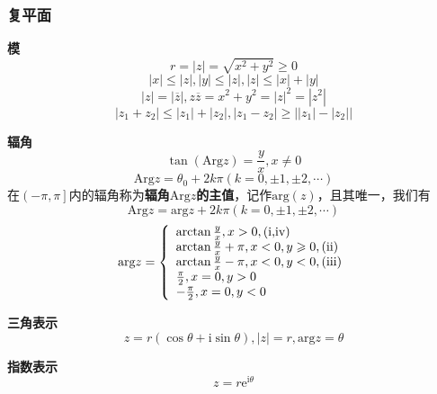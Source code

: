\documentclass[12pt, a4paper, twoside]{ctexbook}
\begin{document}
\subsubsection*{复平面}

\textbf{模}
$$
r=\left| z \right|=\sqrt{x^2+y^2}\geqslant 0
$$
$$
\left| x \right|\leqslant \left| z \right|,\left| y \right|\leqslant \left| z \right|,\left| z \right|\leqslant \left| x \right|+\left| y \right|
$$
$$
\left| z \right|=\left| \overline{z} \right|,z\overline{z}=x^2+y^2=\left| z \right|^2=\left| z^2 \right|
$$
$$
\left| z_1+z_2 \right|\leqslant \left| z_1 \right|+\left| z_2 \right|,\left| z_1-z_2 \right|\geqslant \left| \left| z_1 \right|-\left| z_2 \right| \right|
$$

\textbf{辐角}
$$
\tan \left(\mathrm{Arg}z\right)=\frac{y}{x},x\ne 0
$$
$$
\mathrm{Arg}z=\theta_0+2k\pi\left(k=0,\pm 1,\pm 2,\cdots\right)
$$
在$\left(-\pi,\pi\right]$内的辐角称为\textbf{辐角$\mathrm{Arg}z$的主值}，记作$\mathrm{arg}\left(z\right)$，且其唯一，我们有
$$
\mathrm{Arg}z=\mathrm{arg}z+2k\pi\left(k=0,\pm 1,\pm 2,\cdots\right)
$$
$$
\text{arg}z=\left\{ \begin{array}{l}
	\arctan \frac{y}{x},x>0,\left(\text{\uppercase\expandafter{\romannumeral1},\uppercase\expandafter{\romannumeral4}}\right)\\
	\arctan \frac{y}{x}+\pi ,x<0,y\geqslant 0,\left(\text{\uppercase\expandafter{\romannumeral2}}\right)\\
	\arctan \frac{y}{x}-\pi ,x<0,y<0,\left(\text{\uppercase\expandafter{\romannumeral3}}\right)\\
	\frac{\pi}{2},x=0,y>0\\
	-\frac{\pi}{2},x=0,y<0\\
\end{array} \right. 
$$

\textbf{三角表示}
$$
z=r\left(\cos \theta + \mathrm{i} \sin \theta \right),\left| z \right|=r,\mathrm{arg}z=\theta
$$

\textbf{指数表示}
$$
z=r\mathrm{e}^{\mathrm{i}\theta}
$$
\end{document}
